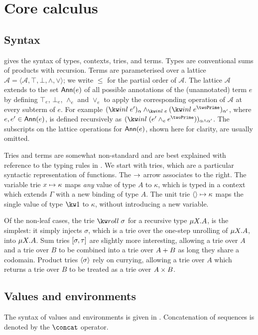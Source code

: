 \section{Core calculus}

\subsection{Syntax}

 gives the syntax of types, contexts, tries, and
terms. Types are conventional sums of products with recursion. Terms are
parameterised over a lattice $\mathcal{A} = \langle \mathcal{A}, \top, \bot,
\wedge, \vee\rangle$; we write $\leq$ for the partial order of $\mathcal{A}$.
The lattice $\mathcal{A}$ extends to the set $\textup{\textsf{Ann}}(e)$ of all possible
annotations of the (unannotated) term $e$ by defining $\top_e$, $\bot_e$,
$\wedge_e$ and $\vee_e$ to apply the corresponding operation of $\mathcal{A}$ at
every subterm of $e$. For example $\annot{(\exInl{e'})}{\alpha}
\wedge_{\exInl{e}} \annot{(\exInl{e^\twoPrime})}{\alpha'}$, where $e, e' \in
\textup{\textsf{Ann}}(e)$, is defined recursively as $\annot{(\exInl{(e' \wedge_e
e^\twoPrime)})}{\alpha \wedge \alpha'}$. The subscripts on the lattice
operations for $\textup{\textsf{Ann}}(e)$, shown here for clarity, are usually omitted.



Tries \cite{hinze00} and terms are somewhat non-standard and are best explained
with reference to the typing rules in . We
start with tries, which are a particular syntactic representation of functions.
The $\to$ arrow associates to the right. The variable trie
$x \mapsto {\kappa}$ maps \emph{any} value of type $A$ to $\kappa$, which is
typed in a context which extends $\Gamma$ with a new binding of type $A$. The
unit trie $\langle\rangle \mapsto {\kappa}$ maps the single value of type $\tyUnit$ to
$\kappa$, without introducing a new variable.



Of the non-leaf cases, the trie $\trieRoll{\sigma}$ for a recursive type
$\mu{X}.{A}$, is the simplest: it simply injects $\sigma$, which is a
trie over the one-step unrolling of $\mu{X}.{A}$, into
$\mu{X}.{A}$. Sum tries $[\sigma,\tau]$ are slightly more
interesting, allowing a trie over $A$ and a trie over $B$ to be combined into a
trie over ${A}+{B}$ as long they share a codomain. Product tries
${\langle\sigma\rangle}$ rely on currying, allowing a trie over $A$ which returns a
trie over $B$ to be treated as a trie over ${A}\times{B}$.

\subsection{Values and environments}




The syntax of values and environments is given in
. Concatenation of sequences is denoted by
the $\concat$ operator.
